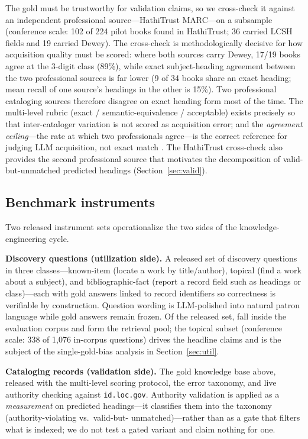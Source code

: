 The gold must be trustworthy for validation claims, so we cross-check it
against an independent professional source---HathiTrust MARC---on a
subsample (conference scale: 102 of 224 pilot books found in HathiTrust; 36
carried LCSH fields and 19 carried Dewey). The cross-check is
methodologically decisive for how acquisition quality must be scored:
where both sources carry Dewey, 17/19 books agree at the 3-digit class
(89\%), while exact subject-heading agreement between the two professional
sources is far lower (9 of 34 books share an exact heading; mean recall of
one source's headings in the other is 15\%). Two professional cataloging
sources therefore disagree on exact heading form most of the time. The
multi-level rubric (exact / semantic-equivalence / acceptable) exists
precisely so that inter-cataloger variation is not scored as acquisition
error; and the \emph{agreement ceiling}---the rate at which two
professionals agree---is the correct reference for judging LLM acquisition,
not exact match . The HathiTrust
cross-check also provides the second professional source that motivates the
decomposition of valid-but-unmatched predicted headings
(Section~\ref{sec:valid}).

\subsection{Benchmark instruments}
\label{sec:data:benchmark}

Two released instrument sets operationalize the two sides of the
knowledge-engineering cycle.

\textbf{Discovery questions (utilization side).} A released set of
discovery questions  in three classes---known-item
(locate a work by title/author), topical (find a work about a subject), and
bibliographic-fact (report a record field such as headings or class)---each
with gold answers linked to record identifiers so correctness is verifiable
by construction. Question wording is LLM-polished into natural patron
language while gold answers remain frozen. Of the released set,
 fall inside the evaluation corpus and form the retrieval
pool; the topical subset (conference scale: 338 of 1{,}076 in-corpus
questions) drives the headline claims and is the subject of the
single-gold-bias analysis in Section~\ref{sec:util}.

\textbf{Cataloging records (validation side).} The gold knowledge base
above, released with the multi-level scoring protocol, the error taxonomy,
and live authority checking against \texttt{id.loc.gov}. Authority
validation is applied as a \emph{measurement} on predicted headings---it
classifies them into the taxonomy (authority-violating vs.\ valid-but-
unmatched)---rather than as a gate that filters what is indexed; we do not
test a gated variant and claim nothing for one.

